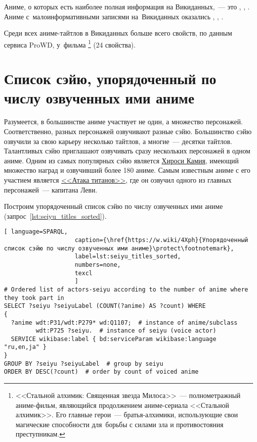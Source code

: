 Аниме, о которых есть наиболее полная информация на Викиданных,~--- 
это , , 
.\, 
Аниме с~малоинформативными записями на~Викиданных оказались 
, 
, 
.

Среди всех аниме-тайтлов в Викиданных больше всего свойств, 
по данным сервиса ProWD, %
у~фильма \footnote{%
%
    <<Стальной алхимик: Священная звезда Милоса>>~--- полнометражный аниме-фильм, 
    являющийся продолжением аниме-сериала <<Стальной алхимик>>. 
    Его главные герои~--- братья-алхимики, 
    использующие свои магические способности 
    для~борьбы с силами зла и противостояния преступникам.%
} (\num{24} свойства).



\section{Список сэйю, упорядоченный по числу озвученных ими аниме}

Разумеется, в большинстве аниме участвует не один, а множество персонажей. 
Соответственно, разных персонажей озвучивают разные сэйю. 
Большинство сэйю озвучили за свою карьеру несколько тайтлов, 
а многие~--- десятки тайтлов. 
Талантливых сэйю приглашают озвучивать сразу нескольких персонажей в одном аниме. Одним из самых популярных сэйю является \href{https://w.wiki/4L5q}{Хироси Камия}, имеющий множество наград и озвучивший более 180 аниме. Самым известным аниме с его участием является \href{https://w.wiki/4L5r}{<<Атака титанов>>}, где он озвучил одного из главных персонажей~--- капитана Леви.

Построим упорядоченный список сэйю по числу озвученных ими аниме (запрос~\ref{lst:seiyu_titles_sorted}).

\newpage
{}
\begin{lstlisting}[ language=SPARQL, 
                    caption={\href{https://w.wiki/4Xph}{Упорядоченный список сэйю по числу озвученных ими аниме}\protect\footnotemark},
                    label=lst:seiyu_titles_sorted,
                    numbers=none,
                    texcl 
                    ]
# Ordered list of actors-seiyu according to the number of anime where they took part in
SELECT ?seiyu ?seiyuLabel (COUNT(?anime) AS ?count) WHERE
{
  ?anime wdt:P31/wdt:P279* wd:Q1107;  # instance of anime/subclass
         wdt:P725 ?seiyu.  # instance of seiyu (voice actor)
  SERVICE wikibase:label { bd:serviceParam wikibase:language "ru,en,ja" }
}
GROUP BY ?seiyu ?seiyuLabel  # group by seiyu 
ORDER BY DESC(?count)  # order by count of voiced anime
\end{lstlisting}%



